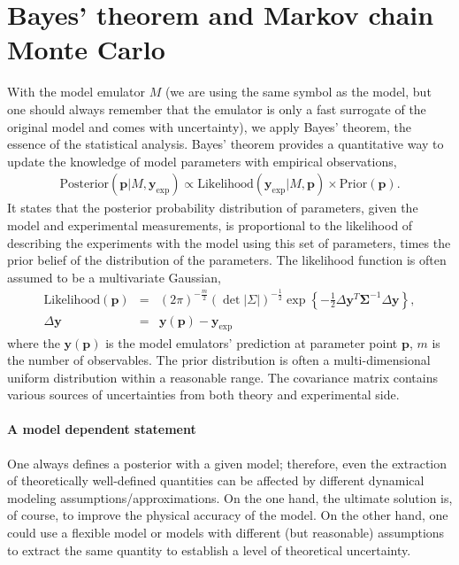 \section{Bayes' theorem and Markov chain Monte Carlo}
With the model emulator $M$ (we are using the same symbol as the model, but one should always remember that the emulator is only a fast surrogate of the original model and comes with uncertainty), we apply Bayes' theorem, the essence of the statistical analysis.
Bayes' theorem provides a quantitative way to update the knowledge of model parameters with empirical observations,
\begin{eqnarray}
\mathrm{Posterior}(\mathbf{p}|M, \mathbf{y}_{\textrm{exp}}) \propto \mathrm{Likelihood}(\mathbf{y}_{\textrm{exp}}|M, \mathbf{p})\times\mathrm{Prior}(\mathbf{p}).
\end{eqnarray}
It states that the posterior probability distribution of parameters, given the model and experimental measurements, is proportional to the likelihood of describing the experiments with the model using this set of parameters, times the prior belief of the distribution of the parameters.
The likelihood function is often assumed to be a multivariate Gaussian,
\begin{eqnarray}
\mathrm{Likelihood}(\mathbf{p}) &=& (2\pi)^{-\frac{m}{2}} (\det|\Sigma|)^{-\frac{1}{2}} \exp\left\{-\frac{1}{2}\Delta \mathbf{y}^T \mathbf{\Sigma}^{-1} \Delta \mathbf{y}\right\}, \\ 
\Delta \mathbf{y} &=& \mathbf{y}(\mathbf{p}) - \mathbf{y}_{\textrm{exp}}
\end{eqnarray}
where the $\mathbf{y}(\mathbf{p})$ is the model emulators' prediction at parameter point $\mathbf{p}$, $m$ is the number of observables.
The prior distribution is often a multi-dimensional uniform distribution within a reasonable range. 
The covariance matrix contains various sources of uncertainties from both theory and experimental side.

\paragraph{A model dependent statement}One always defines a posterior with a given model; therefore, even the extraction of theoretically well-defined quantities can be affected by different dynamical modeling assumptions/approximations.
On the one hand, the ultimate solution is, of course, to improve the physical accuracy of the model.
On the other hand, one could use a flexible model or models with different (but reasonable) assumptions to extract the same quantity to establish a level of theoretical uncertainty.

